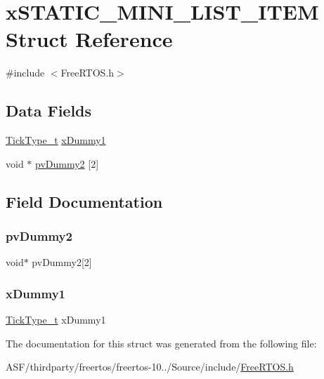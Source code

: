 \hypertarget{structx_s_t_a_t_i_c___m_i_n_i___l_i_s_t___i_t_e_m}{}\section{x\+S\+T\+A\+T\+I\+C\+\_\+\+M\+I\+N\+I\+\_\+\+L\+I\+S\+T\+\_\+\+I\+T\+EM Struct Reference}
\label{structx_s_t_a_t_i_c___m_i_n_i___l_i_s_t___i_t_e_m}


{\ttfamily \#include $<$Free\+R\+T\+O\+S.\+h$>$}

\subsection*{Data Fields}
\begin{DoxyCompactItemize}
\item 
\mbox{\hyperlink{portmacro_8h_aa69c48c6e902ce54f70886e6573c92a9}{Tick\+Type\+\_\+t}} \mbox{\hyperlink{structx_s_t_a_t_i_c___m_i_n_i___l_i_s_t___i_t_e_m_a7eacc6e12219b6aee0a8838ae4d5fa67}{x\+Dummy1}}
\item 
void $\ast$ \mbox{\hyperlink{structx_s_t_a_t_i_c___m_i_n_i___l_i_s_t___i_t_e_m_ad0dea832c70f4f00e7a6b2bfabae5e89}{pv\+Dummy2}} \mbox{[}2\mbox{]}
\end{DoxyCompactItemize}


\subsection{Field Documentation}
\mbox{\label{structx_s_t_a_t_i_c___m_i_n_i___l_i_s_t___i_t_e_m_ad0dea832c70f4f00e7a6b2bfabae5e89}} 
\subsubsection{\texorpdfstring{pvDummy2}{pvDummy2}}
{\footnotesize\ttfamily void$\ast$ pv\+Dummy2\mbox{[}2\mbox{]}}

\mbox{\label{structx_s_t_a_t_i_c___m_i_n_i___l_i_s_t___i_t_e_m_a7eacc6e12219b6aee0a8838ae4d5fa67}} 
\subsubsection{\texorpdfstring{xDummy1}{xDummy1}}
{\footnotesize\ttfamily \mbox{\hyperlink{portmacro_8h_aa69c48c6e902ce54f70886e6573c92a9}{Tick\+Type\+\_\+t}} x\+Dummy1}



The documentation for this struct was generated from the following file\+:\begin{DoxyCompactItemize}
\item 
A\+S\+F/thirdparty/freertos/freertos-\/10../\+Source/include/\mbox{\hyperlink{_free_r_t_o_s_8h}{Free\+R\+T\+O\+S.\+h}}\end{DoxyCompactItemize}
